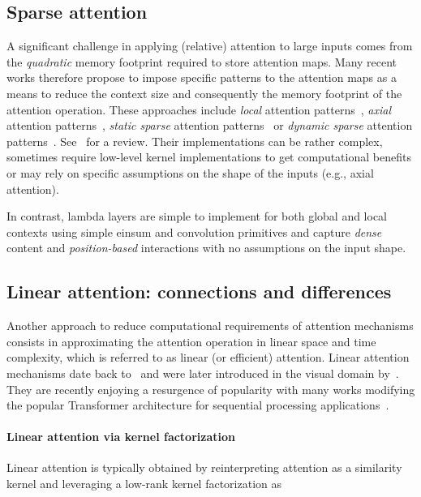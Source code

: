 \documentclass{article} \usepackage{iclr2021_conference,times}
\begin{document}
\vspace{-0.1cm}
\subsection{Sparse attention~\label{sec:sparse_attention}}
A significant challenge in applying (relative) attention to large inputs comes from the \emph{quadratic}  memory footprint required to store attention maps.
Many recent works therefore propose to impose specific patterns to the attention maps as a means to reduce the context size  and consequently the memory footprint of the attention operation.
These approaches include \emph{local} attention patterns~\citep{dai2019xl,parmar2018image,ramachandran2019sasa}, \emph{axial} attention patterns~\citep{ho2019axial,wang2020axialdeeplab}, \emph{static sparse} attention patterns~\citep{child2019sparse,beltagy2020longformer} or \emph{dynamic sparse} attention patterns~\citep{kitaev2020reformer}.
See~\cite{tay2020efficient} for a review.
Their implementations can be rather complex, sometimes require low-level kernel implementations to get computational benefits or may rely on specific assumptions on the shape of the inputs (e.g., axial attention).

In contrast, lambda layers are simple to implement for both global and local contexts using simple einsum and convolution primitives and capture \emph{dense} content and \emph{position-based} interactions with no assumptions on the input shape.

\vspace{-0.1cm}
\subsection{Linear attention: connections and differences~\label{sec:linear_attention}}
Another approach to reduce computational requirements of attention mechanisms consists in approximating the attention operation in linear space and time complexity, which is referred to as linear (or efficient) attention.
Linear attention mechanisms date back to~\cite{debrebisson2016cheap,britz2017efficient} and were later introduced in the visual domain by~\cite{chen2018double,shen2018efficient}.
They are recently enjoying a resurgence of popularity with many works modifying the popular Transformer architecture for sequential processing applications~\citep{katharopoulos2020transformers,wang2020linformer,choromanski2020rethinking}.

\vspace{-0.1cm}
\paragraph{Linear attention via kernel factorization}
Linear attention is typically obtained by reinterpreting attention as a similarity kernel and leveraging a low-rank kernel factorization as
\end{document}
